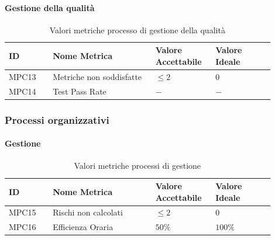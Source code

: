 \documentclass[a4paper,12pt]{article}
\begin{document}
                \paragraph{Gestione della qualità} \mbox{}
                    \begin{longtable}{|M{0.15\linewidth}|M{0.35\linewidth}|M{0.2\linewidth}|M{0.2\linewidth}|}

                        \caption{Valori metriche processo di gestione della qualità} \\
                        \hline
                        \textbf{ID} & \textbf{Nome Metrica} & \textbf{Valore Accettabile} & \textbf{Valore Ideale} \\
                        \hline
                        \endhead

                        MPC13 & Metriche non soddisfatte & $\le 2$ & $0$ \\
                        \hline

                        MPC14 & Test Pass Rate & $-$ & $-$ \\
                        \hline

                    \end{longtable}


            \subsubsection{Processi organizzativi}
                \paragraph{Gestione} \mbox{}
                    \begin{longtable}{|M{0.15\linewidth}|M{0.35\linewidth}|M{0.2\linewidth}|M{0.2\linewidth}|}

                        \caption{Valori metriche processi di gestione} \\
                        \hline
                        \textbf{ID} & \textbf{Nome Metrica} & \textbf{Valore Accettabile} & \textbf{Valore Ideale} \\
                        \hline
                        \endhead

                        MPC15 & Rischi non calcolati & $\le 2$ & $0$ \\
                        \hline

                        MPC16 & Efficienza Oraria & $50\%$ & $100\%$ \\
                        \hline

                    \end{longtable}
\end{document}
